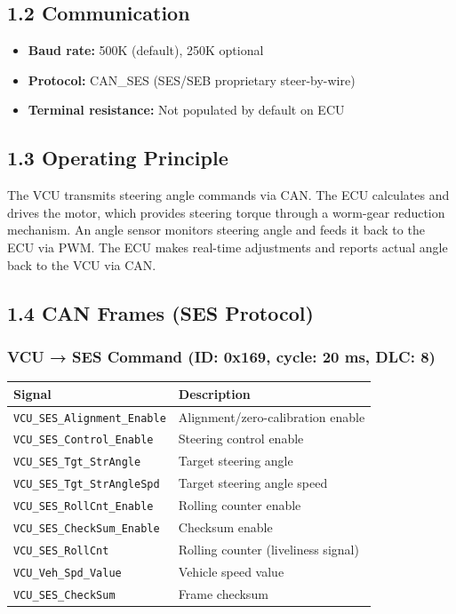 \documentclass[12pt,a4paper,oneside]{report}
\providecommand{\tightlist}{\setlength{\itemsep}{0pt}\setlength{\parskip}{0pt}}
\begin{document}
\subsection{1.2 Communication}\label{communication}

\begin{itemize}
\tightlist
\item
  \textbf{Baud rate:} 500K (default), 250K optional
\item
  \textbf{Protocol:} CAN\_SES (SES/SEB proprietary steer-by-wire)
\item
  \textbf{Terminal resistance:} Not populated by default on ECU
\end{itemize}

\subsection{1.3 Operating Principle}\label{operating-principle}

The VCU transmits steering angle commands via CAN. The ECU calculates and drives
the motor, which provides steering torque through a worm-gear reduction
mechanism. An angle sensor monitors steering angle and feeds it back to the ECU
via PWM. The ECU makes real-time adjustments and reports actual angle back to
the VCU via CAN.

\subsection{1.4 CAN Frames (SES Protocol)}\label{can-frames-ses-protocol}

\subsubsection{VCU → SES Command (ID: 0x169, cycle: 20 ms, DLC:
8)}\label{vcu-SES-command-id-0x169-cycle-20-ms-dlc-8}

\begin{longtable}[]{@{}ll@{}}
\toprule\noalign{}
Signal & Description \\
\midrule\noalign{}
\endhead
\bottomrule\noalign{}
\endlastfoot
\texttt{VCU\_SES\_Alignment\_Enable} & Alignment/zero-calibration enable \\
\texttt{VCU\_SES\_Control\_Enable} & Steering control enable \\
\texttt{VCU\_SES\_Tgt\_StrAngle} & Target steering angle \\
\texttt{VCU\_SES\_Tgt\_StrAngleSpd} & Target steering angle speed \\
\texttt{VCU\_SES\_RollCnt\_Enable} & Rolling counter enable \\
\texttt{VCU\_SES\_CheckSum\_Enable} & Checksum enable \\
\texttt{VCU\_SES\_RollCnt} & Rolling counter (liveliness signal) \\
\texttt{VCU\_Veh\_Spd\_Value} & Vehicle speed value \\
\texttt{VCU\_SES\_CheckSum} & Frame checksum \\
\end{longtable}
\end{document}
